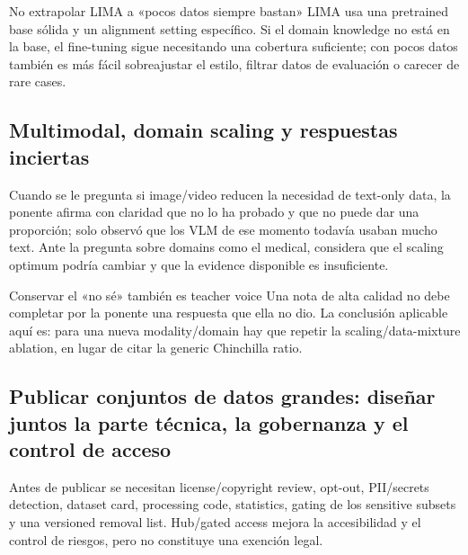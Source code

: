 \begin{warningbox}{No extrapolar LIMA a «pocos datos siempre bastan»}
LIMA usa una pretrained base sólida y un alignment setting específico. Si el domain knowledge no está en la base, el fine-tuning sigue necesitando una cobertura suficiente; con pocos datos también es más fácil sobreajustar el estilo, filtrar datos de evaluación o carecer de rare cases.
\end{warningbox}


\subsection{Multimodal, domain scaling y respuestas inciertas}

Cuando se le pregunta si image/video reducen la necesidad de text-only data, la ponente afirma con claridad que no lo ha probado y que no puede dar una proporción; solo observó que los VLM de ese momento todavía usaban mucho text. Ante la pregunta sobre domains como el medical, considera que el scaling optimum podría cambiar y que la evidence disponible es insuficiente.

\begin{importantbox}{Conservar el «no sé» también es teacher voice}
Una nota de alta calidad no debe completar por la ponente una respuesta que ella no dio. La conclusión aplicable aquí es: para una nueva modality/domain hay que repetir la scaling/data-mixture ablation, en lugar de citar la generic Chinchilla ratio.
\end{importantbox}


\subsection{Publicar conjuntos de datos grandes: diseñar juntos la parte técnica, la gobernanza y el control de acceso}

Antes de publicar se necesitan license/copyright review, opt-out, PII/secrets detection, dataset card, processing code, statistics, gating de los sensitive subsets y una versioned removal list. Hub/gated access mejora la accesibilidad y el control de riesgos, pero no constituye una exención legal.

